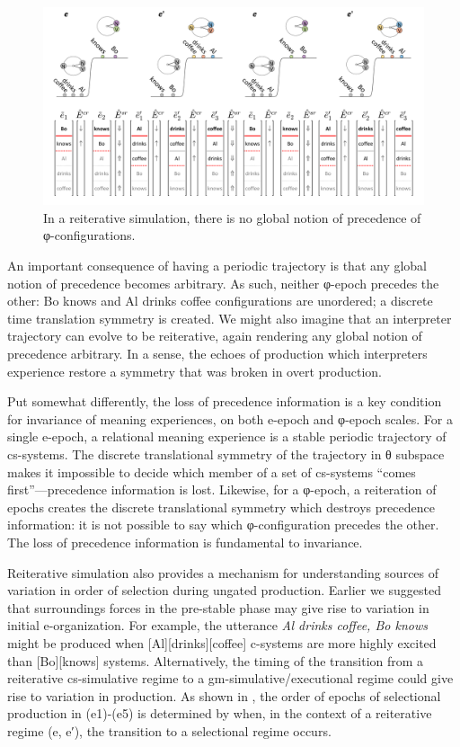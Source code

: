   
\begin{figure}
\includegraphics[width=\textwidth]{figures/Tilsen-img115.png}
\caption{In a reiterative simulation, there is no global notion of precedence of φ-configurations.}
\label{fig:5:11}
\end{figure}
 

  An important consequence of having a periodic trajectory is that any global notion of precedence becomes arbitrary. As such, neither φ-epoch precedes the other: {\textbar}Bo knows{\textbar} and {\textbar}Al drinks coffee{\textbar} configurations are unordered; a discrete time translation symmetry is created. We might also imagine that an interpreter trajectory can evolve to be reiterative, again rendering any global notion of precedence arbitrary. In a sense, the echoes of production which interpreters experience restore a symmetry that was broken in overt production. 

  Put somewhat differently, the loss of precedence information is a key condition for invariance of meaning experiences, on both e-epoch and φ-epoch scales. For a single e-epoch, a relational meaning experience is a stable periodic trajectory of cs-systems. The discrete translational symmetry of the trajectory in θ subspace makes it impossible to decide which member of a set of cs-systems “comes first”—precedence information is lost. Likewise, for a φ-epoch, a reiteration of epochs creates the discrete translational symmetry which destroys precedence information: it is not possible to say which φ-configuration precedes the other. The loss of precedence information is fundamental to invariance. 

  Reiterative simulation also provides a mechanism for understanding sources of variation in order of selection during ungated production. Earlier we suggested that surroundings forces in the pre-stable phase may give rise to variation in initial e-organization. For example, the utterance \textit{Al drinks coffee, Bo knows} might be produced when [Al][drinks][coffee] c-systems are more highly excited than [Bo][knows] systems. Alternatively, the timing of the transition from a reiterative cs-simulative regime to a gm-simulative/executional regime could give rise to variation in production. As shown in {}, the order of epochs of selectional production in (e1)-(e5) is determined by when, in the context of a reiterative regime (e, e′), the transition to a selectional regime occurs.

